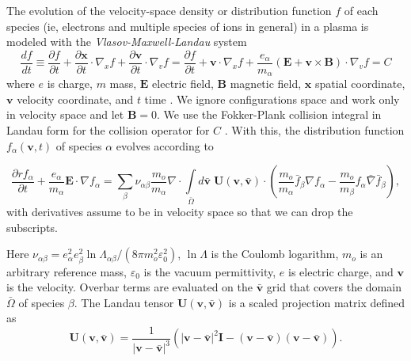 \documentclass[12pt]{siamart}
\begin{document}
The evolution of the velocity-space density or
distribution function $f$ of each species (ie, electrons and multiple
species of ions in general) in a plasma is modeled with the {\it Vlasov-Maxwell-Landau} system
\begin{equation*}
\frac{df}{dt}\equiv
\frac{\partial f}{\partial t} + \frac{\partial\bm x}{\partial t}
\cdot \nabla_x f+ \frac{\partial\bm v}{\partial t} \cdot \nabla_v f
= \frac{\partial f}{\partial t} + {\bm v} \cdot \nabla_x f+
\frac{e_{\alpha}}{m_{\alpha}}\left( {\bm E} + {\bm v} \times {\bm B} \right) \cdot
\nabla_v f = C
\end{equation*}
where $e$ is charge, $m$ mass, ${\bm E} $ electric field, ${\bm B}$
magnetic field, ${\bm x}$ spatial coordinate, ${\bm v}$ velocity
coordinate, and $t$ time \cite{Vlasov1968}.
We ignore configurations space and work only in velocity space and let ${\bm B=0}$.
We use  the Fokker-Plank collision integral in Landau form for the collision operator for $C$ \cite{landau1936kinetic}.
With this, the distribution function $f_{\alpha}(\bm{v},t)$ of species $\alpha$ evolves according to

\begin{equation*}
\label{eq:landau1}
\frac{\partial r f_{\alpha}}{\partial t} + \frac{e_{\alpha}}{m_{\alpha}} {\bm E} \cdot \nabla f_{\alpha} = 
\sum_{\beta}\nu_{\alpha\beta}\frac{m_o}{m_{\alpha}}\nabla \cdot\int \limits_{\bar\Omega} d\bm{\bar{v}}\;\mathbf{U}(\bm{v},\bm{\bar{v}})\cdot\left(\frac{m_o}{m_{\alpha}}\bar{f}_{\beta}\nabla f_{\alpha} - \frac{m_o}{m_{\beta}}f_{\alpha} \bar \nabla \bar{f}_{\beta}\right),
\end{equation*}
with derivatives assume to be in velocity space so that we can drop the subscripts.

Here
$\nu_{\alpha\beta}=e_{\alpha}^2e_{\beta}^2\ln\Lambda_{\alpha\beta}/(8\pi m_o^2\varepsilon_0^2)$, $\ln\Lambda$ is the Coulomb logarithm, $m_o$
is an arbitrary reference mass, $\varepsilon_0$ is the vacuum
permittivity, $e$ is electric charge, and $\bm{v}$ is the velocity. Overbar terms are evaluated on the $\bm{\bar{v}}$ grid that covers the domain $\bar\Omega$ of species $\beta$.  The
Landau tensor $\mathbf{U}(\bm{v},\bm{\bar{v}})$ is a scaled projection
matrix defined as
\begin{equation*}
\label{eq:landau_tensor}
\mathbf{U}(\bm{v},\bm{\bar{v}})=\frac{1}{\lvert\bm{v}-\bm{\bar{v}}\rvert^3}\left(\lvert\bm{v}-\bm{\bar{v}}\rvert^2\mathbf{I}-(\bm{v}-\bm{\bar{v}})(\bm{v}-\bm{\bar{v}})\right).
\end{equation*}
\end{document}
